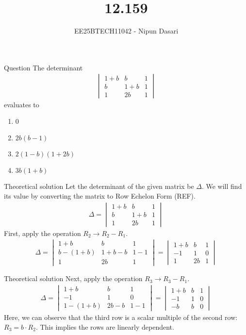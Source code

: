 \documentclass{beamer}
\title{12.159}
\author{EE25BTECH11042 - Nipun Dasari}
\numberwithin{equation}{section}
\theoremstyle{remark}
\newcommand{\mydet}[1]{\ensuremath{\begin{vmatrix}#1\end{vmatrix}}}
\begin{document}
	
	\begin{frame}
		\titlepage
	\end{frame}
	
	\begin{frame}{Question}
		The determinant
		\begin{align}
			\mydet{1+b & b & 1 \\ b & 1+b & 1 \\ 1 & 2b & 1}
		\end{align}
		evaluates to
		\begin{enumerate}[label=\alph*)]
			\item $0$
			\item $2b(b-1)$
			\item $2(1-b)(1+2b)$
			\item $3b(1+b)$
		\end{enumerate}
	\end{frame}
	
	\begin{frame}{Theoretical solution}
		Let the determinant of the given matrix be $\Delta$. We will find its value by converting the matrix to Row Echelon Form (REF).
		\begin{align}
			\Delta = \mydet{1+b & b & 1 \\ b & 1+b & 1 \\ 1 & 2b & 1}
		\end{align}
		First, apply the operation $R_2 \to R_2 - R_1$.
		\begin{align}
			\Delta = \mydet{1+b & b & 1 \\ b-(1+b) & 1+b-b & 1-1 \\ 1 & 2b & 1} = \mydet{1+b & b & 1 \\ -1 & 1 & 0 \\ 1 & 2b & 1}
		\end{align}
	\end{frame}
	
	\begin{frame}{Theoretical solution}
		Next, apply the operation $R_3 \to R_3 - R_1$.
		\begin{align}
			\Delta = \mydet{1+b & b & 1 \\ -1 & 1 & 0 \\ 1-(1+b) & 2b-b & 1-1} = \mydet{1+b & b & 1 \\ -1 & 1 & 0 \\ -b & b & 0}
		\end{align}
		Here, we can observe that the third row is a scalar multiple of the second row: $R_3 = b \cdot R_2$. This implies the rows are linearly dependent.
	\end{frame}
	
\end{document}
